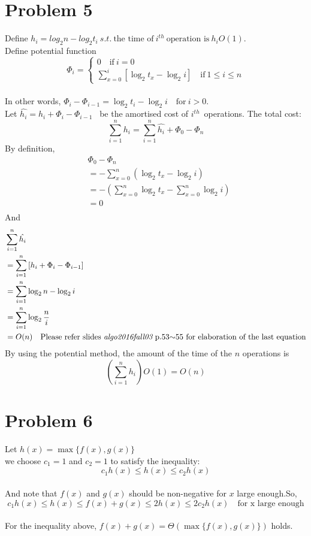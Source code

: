 \documentclass[a4paper]{article}
\begin{document}
\section{Problem 5}
Define $h_i = log_{2}n-log_{2}t_i\ s.t.\ 
\text{the time of}\ i^{th}\ \text{operation is}\ h_{i}O(1)$.\\
Define potential function\\
$$\Phi_i =
\begin{cases}
0\quad \text{if}\ i=0\\
\sum\limits_{x=0}^{i} 
	[\log_{2}t_x - \log_{2}i]
	\quad \text{if}\ 1\leq i\leq n
\end{cases}
$$ \\
In other words, $\Phi_i-\Phi_{i-1}=\log_{2}t_i - \log_{2}i\quad \text{for}\ i>0$.\\
Let $\hat{h_i} = h_i +\Phi_i -\Phi_{i-1} $ \ be the amortised cost of $i^{th}$\ operations. The total cost:
$$\sum\limits_{i=1}^{n}h_i=\sum\limits_{i=1}^{n}\hat{h_i}+\Phi_0-\Phi_n$$
By definition,\\
\begin{align*}
&\Phi_0-\Phi_n\\
&=-\sum\limits_{x=0}^n (\log_2{t_x}-\log_2i) \\
&=-\left(\sum\limits_{x=0}^{n}\log_2t_x-\sum\limits_{x=0}^{n}\log_2i\right)\\
&=0\\
\end{align*}
And\\
\begin{align*}
&\sum\limits_{i=1}^{n}\hat{h_i}\\
&=\sum\limits_{i=1}^{n}\left[h_i+\Phi_i-\Phi_{i-1}\right]\\
&=\sum\limits_{i=1}^{n}\log_2n-\log_2i\\
&=\sum\limits_{i=1}^{n}\log_2\frac{n}{i}\\
&=O(n) \quad\text{Please refer slides {\em algo2016fall03} p.53$\sim$55 for elaboration of the last equation}
\end{align*}
By using the potential method, the amount of the time of the $n$ operations is\\
$$\left(\sum\limits_{i=1}^{n}h_i\right)O(1)=O(n)$$
\section{Problem 6}
Let $h(x)=\max\{f(x),g(x)\}$\\
we choose $c_1=1$ and $c_2=1$ to satisfy the inequality:\\
$$c_1h(x)\leq h(x)\leq c_2h(x)$$\\
And note that $f(x)$ and $g(x)$ should be non-negative for $x$ large enough.So,\\
$$c_1h(x)\leq h(x)\leq f(x)+g(x)\leq 2h(x)\leq 2c_2h(x)\quad\text{for x large enough}$$\\
For the inequality above, $f(x)+g(x)=\Theta(\max\{f(x),g(x)\})$ holds.
\end{document}
